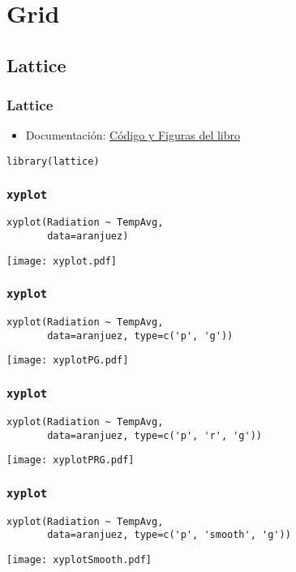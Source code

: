 \documentclass[xcolor={usenames,svgnames,dvipsnames}]{beamer}
\begin{document}
\section{Grid}
\label{sec-2}
\subsection{Lattice}
\label{sec-2-1}
\begin{frame}[fragile]
\frametitle{Lattice}
\label{sec-2-1-1}


\begin{itemize}
\item Documentación: \href{http://lmdvr.r-forge.r-project.org/figures/figures.html}{Código y Figuras del libro}
\end{itemize}


\lstset{language=R}
\begin{lstlisting}
library(lattice)
\end{lstlisting}
\end{frame}
\begin{frame}[fragile]
\frametitle{\texttt{xyplot}}
\label{sec-2-1-2}


\lstset{language=R}
\begin{lstlisting}
xyplot(Radiation ~ TempAvg,
       data=aranjuez)
\end{lstlisting}

\texttt{[image: xyplot.pdf]}
\end{frame}
\begin{frame}[fragile]
\frametitle{\texttt{xyplot}}
\label{sec-2-1-3}


\lstset{language=R}
\begin{lstlisting}
xyplot(Radiation ~ TempAvg,
       data=aranjuez, type=c('p', 'g'))
\end{lstlisting}

\texttt{[image: xyplotPG.pdf]}
\end{frame}
\begin{frame}[fragile]
\frametitle{\texttt{xyplot}}
\label{sec-2-1-4}


\lstset{language=R}
\begin{lstlisting}
xyplot(Radiation ~ TempAvg,
       data=aranjuez, type=c('p', 'r', 'g'))
\end{lstlisting}

\texttt{[image: xyplotPRG.pdf]}
\end{frame}
\begin{frame}[fragile]
\frametitle{\texttt{xyplot}}
\label{sec-2-1-5}


\lstset{language=R}
\begin{lstlisting}
xyplot(Radiation ~ TempAvg,
       data=aranjuez, type=c('p', 'smooth', 'g'))
\end{lstlisting}

\texttt{[image: xyplotSmooth.pdf]}
\end{frame}
\end{document}
